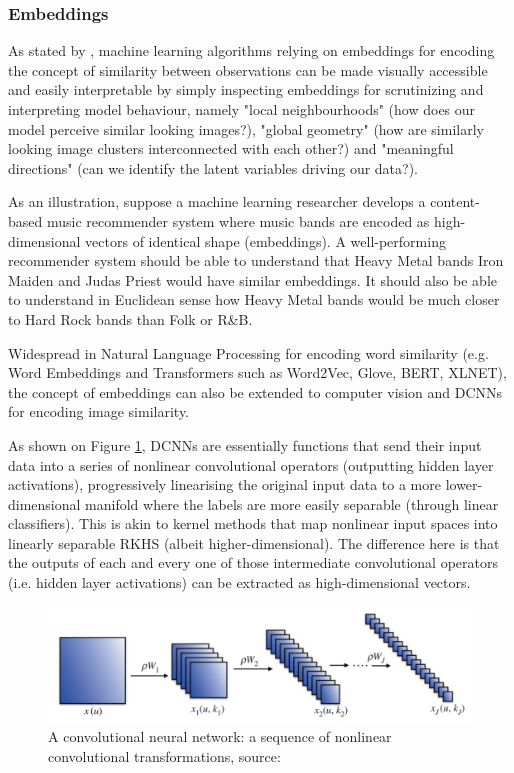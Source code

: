 \subsubsection{Embeddings}

As stated by \cite{Smilkov2016EmbeddingPI}, machine learning algorithms relying on embeddings for encoding the concept of similarity between observations can be made visually accessible and easily interpretable by simply inspecting embeddings for scrutinizing and interpreting model behaviour, namely "local neighbourhoods" (how does our model perceive similar looking images?), "global geometry" (how are similarly looking image clusters interconnected with each other?) and "meaningful directions" (can we identify the latent variables driving our data?).

As an illustration, suppose a machine learning researcher develops a content-based music recommender system where music bands are encoded as high-dimensional vectors of identical shape (embeddings). A well-performing recommender system should be able to understand that Heavy Metal bands Iron Maiden and Judas Priest would have similar embeddings. It should also be able to understand in Euclidean sense how Heavy Metal bands would be much closer to Hard Rock bands than Folk or R\&B.

Widespread in Natural Language Processing for encoding word similarity (e.g. Word Embeddings and Transformers such as Word2Vec, Glove, BERT, XLNET), the concept of embeddings can also be extended to computer vision and DCNNs for encoding image similarity.

As shown on Figure \ref{fig:HRV_003_Mallat_CNN}, DCNNs are essentially functions that send their input data into a series of nonlinear convolutional operators (outputting hidden layer activations), progressively linearising the original input data to a more lower-dimensional manifold where the labels are more easily separable (through linear classifiers). This is akin to kernel methods that map nonlinear input spaces into linearly separable RKHS (albeit higher-dimensional). The difference here is that the outputs of each and every one of those intermediate convolutional operators (i.e. hidden layer activations) can be extracted as high-dimensional vectors.

\vspace{0.2cm}

\begin{figure}[H]
\centering
\includegraphics[scale=0.6]{images/embedding_view/HRV_Fig_003_Mallat_CNN.PNG}
\caption{A convolutional neural network: a sequence of nonlinear convolutional transformations, source: \cite{Mallat2016UnderstandingDC}}
\label{fig:HRV_003_Mallat_CNN}
\end{figure}

